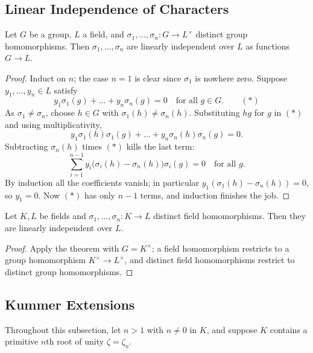 \documentclass[a4paper]{scrartcl}
\begin{document}
\subsection{Linear Independence of Characters}

\begin{theorem}\label{thm:linind}
	Let $G$ be a group, $L$ a field, and $\sigma_1, \dots, \sigma_n : G \to L^\times$ distinct group homomorphisms. Then $\sigma_1,\dots,\sigma_n$ are linearly independent over $L$ as functions $G \to L$.
\end{theorem}

\begin{proof}
	Induct on $n$; the case $n = 1$ is clear since $\sigma_1$ is nowhere zero. Suppose $y_1, \dots, y_n \in L$ satisfy
	$$y_1\sigma_1(g) + \dots + y_n\sigma_n(g) = 0 \quad\text{for all } g \in G. \qquad (\ast)$$
	As $\sigma_1 \neq \sigma_n$, choose $h \in G$ with $\sigma_1(h)\neq\sigma_n(h)$. Substituting $hg$ for $g$ in $(\ast)$ and using multiplicativity,
	$$y_1\sigma_1(h)\sigma_1(g)+\dots+y_n\sigma_n(h)\sigma_n(g) = 0.$$
	Subtracting $\sigma_n(h)$ times $(\ast)$ kills the last term:
	$$\sum_{i=1}^{n-1}y_i\big(\sigma_i(h)-\sigma_n(h)\big)\sigma_i(g) = 0 \quad\text{for all }g.$$
	By induction all the coefficients vanish; in particular $y_1(\sigma_1(h)-\sigma_n(h)) = 0$, so $y_1 = 0$. Now $(\ast)$ has only $n-1$ terms, and induction finishes the job.
\end{proof}

\begin{corollary}\label{cor:linind}
	Let $K, L$ be fields and $\sigma_1,\dots,\sigma_n : K \to L$ distinct field homomorphisms. Then they are linearly independent over $L$.
\end{corollary}

\begin{proof}
	Apply the theorem with $G = K^\times$; a field homomorphism restricts to a group homomorphism $K^\times \to L^\times$, and distinct field homomorphisms restrict to distinct group homomorphisms.
\end{proof}

\subsection{Kummer Extensions}

Throughout this subsection, let $n > 1$ with $n \neq 0$ in $K$, and suppose $K$ contains a primitive $n$th root of unity $\zeta = \zeta_n$.
\end{document}
